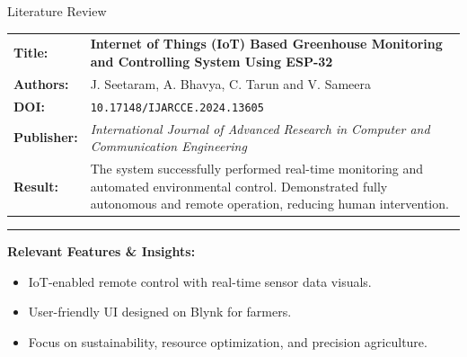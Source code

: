 \documentclass{beamer}
\begin{document}
\begin{frame} {Literature Review}

    \begin{tabularx} {\textwidth} {
            >{\bfseries}m{2.0cm}X
        }

        Title: & \textbf{Internet of Things (IoT) Based Greenhouse Monitoring and Controlling System Using ESP-32}
        \\

        Authors: & J. Seetaram, A. Bhavya, C. Tarun and V. Sameera
        \\

        DOI: & \texttt{10.17148/IJARCCE.2024.13605}

        \\

        Publisher: & \textit{International Journal of Advanced Research in Computer and Communication Engineering} \vfill
        \\

        Result: &
        The system successfully performed real-time monitoring and automated environmental control.
        Demonstrated fully autonomous and remote operation, reducing human intervention.

        \\

    \end{tabularx}

    {\color{leafColorSecondary} \rule{\textwidth}{0.75pt}}

    \textbf{Relevant Features \& Insights:}

    \begin{itemize}
        \item IoT-enabled remote control with real-time sensor data visuals.

        \item User-friendly UI designed on Blynk for farmers.

        \item Focus on sustainability, resource optimization, and precision agriculture.
    \end{itemize}

\end{frame}
\end{document}
